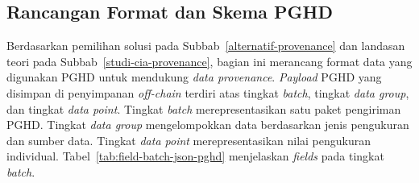 \subsection{Rancangan Format dan Skema PGHD}\label{rancangan-format-data-pghd}

Berdasarkan pemilihan solusi pada Subbab~\ref{alternatif-provenance} dan landasan teori pada Subbab~\ref{studi-cia-provenance}, bagian ini merancang format data yang digunakan PGHD untuk mendukung \textit{data provenance}.
\textit{Payload} PGHD yang disimpan di penyimpanan \textit{off-chain} terdiri atas tingkat \textit{batch}, tingkat \textit{data group}, dan tingkat \textit{data point}.
Tingkat \textit{batch} merepresentasikan satu paket pengiriman PGHD\@.
Tingkat \textit{data group} mengelompokkan data berdasarkan jenis pengukuran dan sumber data.
Tingkat \textit{data point} merepresentasikan nilai pengukuran individual.
Tabel~\ref{tab:field-batch-json-pghd} menjelaskan \textit{fields} pada tingkat \textit{batch}.

